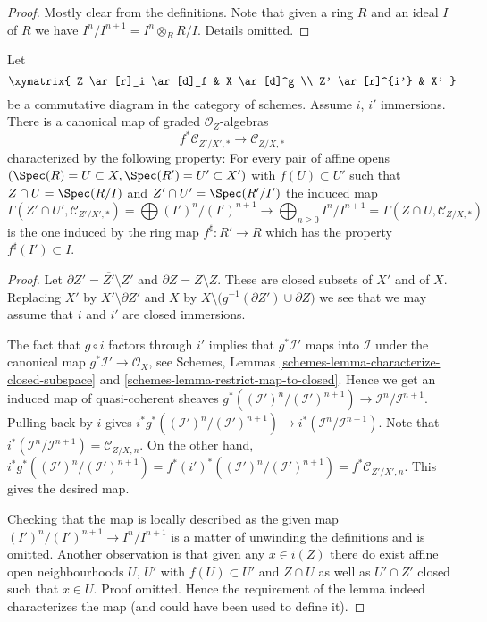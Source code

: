 \begin{proof}
Mostly clear from the definitions. Note that given a ring $R$ and
an ideal $I$ of $R$ we have $I^n/I^{n + 1} = I^n \otimes_R R/I$.
Details omitted.
\end{proof}

\begin{lemma}
\label{lemma-conormal-algebra-functorial}
Let
$$
\xymatrix{
Z \ar[r]_i \ar[d]_f & X \ar[d]^g \\
Z' \ar[r]^{i'} & X'
}
$$
be a commutative diagram in the category of schemes.
Assume $i$, $i'$ immersions. There is a canonical map
of graded $\mathcal{O}_Z$-algebras
$$
f^*\mathcal{C}_{Z'/X', *}
\longrightarrow
\mathcal{C}_{Z/X, *}
$$
characterized by the following property: For every pair of affine opens
$(\Spec(R) = U \subset X, \Spec(R') = U' \subset X')$ with
$f(U) \subset U'$ such that
$Z \cap U = \Spec(R/I)$ and $Z' \cap U' = \Spec(R'/I')$
the induced map
$$
\Gamma(Z' \cap U', \mathcal{C}_{Z'/X', *}) =
\bigoplus\nolimits (I')^n/(I')^{n + 1}
\longrightarrow
\bigoplus\nolimits_{n \geq 0} I^n/I^{n + 1} =
\Gamma(Z \cap U, \mathcal{C}_{Z/X, *})
$$
is the one induced by the ring map $f^\sharp : R' \to R$ which
has the property $f^\sharp(I') \subset I$.
\end{lemma}

\begin{proof}
Let $\partial Z' = \overline{Z'} \setminus Z'$ and
$\partial Z = \overline{Z} \setminus Z$. These are closed subsets of $X'$ and
of $X$. Replacing $X'$ by $X' \setminus \partial Z'$ and $X$ by
$X \setminus \big(g^{-1}(\partial Z') \cup \partial Z\big)$ we
see that we may assume that $i$ and $i'$ are closed immersions.

\medskip\noindent
The fact that $g \circ i$ factors through $i'$ implies that
$g^*\mathcal{I}'$ maps into $\mathcal{I}$ under the canonical
map $g^*\mathcal{I}' \to \mathcal{O}_X$, see
Schemes, Lemmas
\ref{schemes-lemma-characterize-closed-subspace} and
\ref{schemes-lemma-restrict-map-to-closed}.
Hence we get an induced map of quasi-coherent sheaves
$g^*((\mathcal{I}')^n/(\mathcal{I}')^{n + 1}) \to
\mathcal{I}^n/\mathcal{I}^{n + 1}$.
Pulling back by $i$ gives
$i^*g^*((\mathcal{I}')^n/(\mathcal{I}')^{n + 1}) \to
i^*(\mathcal{I}^n/\mathcal{I}^{n + 1})$.
Note that
$i^*(\mathcal{I}^n/\mathcal{I}^{n + 1}) = \mathcal{C}_{Z/X, n}$.
On the other hand,
$i^*g^*((\mathcal{I}')^n/(\mathcal{I}')^{n + 1}) =
f^*(i')^*((\mathcal{I}')^n/(\mathcal{I}')^{n + 1}) =
f^*\mathcal{C}_{Z'/X', n}$.
This gives the desired map.

\medskip\noindent
Checking that the map is locally described as the given map
$(I')^n/(I')^{n + 1} \to I^n/I^{n + 1}$ is a matter of unwinding the
definitions and is omitted. Another observation is that given any
$x \in i(Z)$ there do exist affine open neighbourhoods $U$, $U'$
with $f(U) \subset U'$ and $Z \cap U$ as well as $U' \cap Z'$
closed such that $x \in U$. Proof omitted. Hence the requirement
of the lemma indeed characterizes the map (and could have been used
to define it).
\end{proof}


